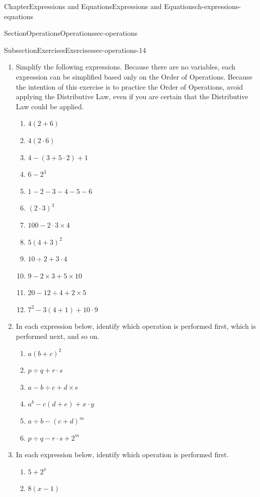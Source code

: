 \documentclass[twoside,11pt,]{book}
\numberwithin{equation}{chapter}
\begin{document}
\begin{chapterptx}{Chapter}{Expressions and Equations}{}{Expressions and Equations}{}{}{ch-expressions-equations}
\begin{sectionptx}{Section}{Operations}{}{Operations}{}{}{sec-operations}
\begin{subsectionptx}{Subsection}{Exercises}{}{Exercises}{}{}{sec-operations-14}
\begin{enumerate}
%
\item{}Simplify the following expressions. Because there are no variables, each expression can be simplified based only on the Order of Operations. Because the intention of this exercise is to practice the Order of Operations, avoid applying the Distributive Law, even if you are certain that the Distributive Law could be applied.%
\begin{enumerate}
\item{}\(\displaystyle 4(2+6)\)%
\item{}\(\displaystyle 4(2 \cdot 6)\)%
\item{}\(\displaystyle 4 - (3+5 \cdot 2) + 1\)%
\item{}\(\displaystyle 6 - 2^3\)%
\item{}\(\displaystyle 1-2-3-4-5-6\)%
\item{}\(\displaystyle (2 \cdot 3)^3\)%
\item{}\(\displaystyle 100-2 \cdot 3 \times 4\)%
\item{}\(\displaystyle 5(4+3)^2\)%
\item{}\(\displaystyle 10 \div 2 + 3 \cdot 4\)%
\item{}\(\displaystyle 9 - 2 \times 3 + 5 \times 10\)%
\item{}\(\displaystyle 20 - 12 \div 4 + 2 \times 5\)%
\item{}\(\displaystyle 7^2 - 3(4+1) + 10 \cdot 9\)%
\end{enumerate}
%
\item{}In each expression below, identify which operation is performed first, which is performed next, and so on.%
\begin{enumerate}
\item{}\(\displaystyle a(b+c)^2\)%
\item{}\(\displaystyle p \div q + r \cdot s\)%
\item{}\(\displaystyle a - b \div c + d \times e\)%
\item{}\(\displaystyle a^b - c(d+e) + x \cdot y\)%
\item{}\(\displaystyle a \div b - (c+d)^m\)%
\item{}\(\displaystyle p \div q - r \cdot s + 2^m\)%
\end{enumerate}
%
\item{}In each expression below, identify which operation is performed first.%
\begin{enumerate}
\item{}\(\displaystyle 5+2^x\)%
\item{}\(\displaystyle 8(x-1)\)%

\end{enumerate}
\end{enumerate}
\end{subsectionptx}
\end{sectionptx}
\end{chapterptx}
\end{document}

